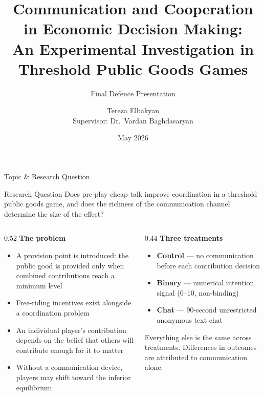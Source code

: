 \documentclass[aspectratio=169,10pt]{beamer}
\title[Threshold PGG]{Communication and Cooperation in Economic Decision Making:\\
  An Experimental Investigation in Threshold Public Goods Games}
\subtitle{Final Defence Presentation}
\author[T.~Elbakyan]{Tereza Elbakyan\\[0.25em]{\small Supervisor: Dr.~Vardan Baghdasaryan}}
\institute{American University of Armenia\\
  Manoogian Simone College of Business and Economics}
\date{May 2026}
\newcommand{\cg}[1]{\textcolor{controlgreen}{\textbf{#1}}}
\newcommand{\bo}[1]{\textcolor{binaryorange}{\textbf{#1}}}
\newcommand{\cb}[1]{\textcolor{chatblue}{\textbf{#1}}}
\begin{document}

\begin{frame}[plain]
  \titlepage
\end{frame}

\begin{frame}{Topic \& Research Question}

\begin{block}{Research Question}
\small
Does pre-play cheap talk improve coordination in a threshold public goods game,
and does the richness of the communication channel determine the size of the effect?
\end{block}

\vspace{0.5em}
\begin{columns}[T]
  \begin{column}{0.52\textwidth}
    \textbf{The problem}
    \begin{itemize}\small
      \item A provision point is introduced: the public good is provided only when combined
            contributions reach a minimum level
      \item Free-riding incentives exist alongside a coordination problem
      \item An individual player's contribution depends on the belief that others will
            contribute enough for it to matter
      \item Without a communication device, players may shift toward the inferior equilibrium
    \end{itemize}
  \end{column}
  \begin{column}{0.44\textwidth}
    \textbf{Three treatments}
    \begin{itemize}\small
      \item \cg{Control} --- no communication before each contribution decision
      \item \bo{Binary} --- numerical intention signal (0--10, non-binding)
      \item \cb{Chat} --- 90-second unrestricted anonymous text chat
    \end{itemize}
    \vspace{0.4em}
    \small Everything else is the same across treatments.
    Differences in outcomes are attributed to communication alone.
  \end{column}
\end{columns}

\end{frame}
\end{document}
